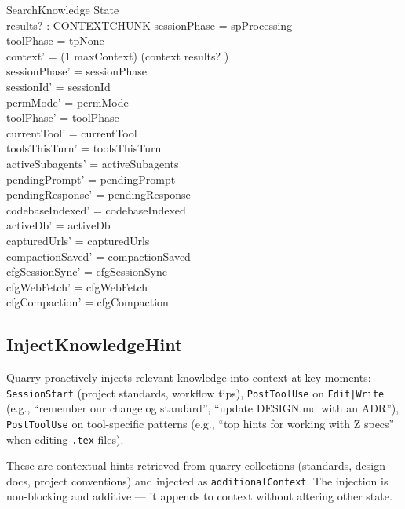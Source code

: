 \documentclass[a4paper,10pt,fleqn]{article}
\begin{document}
\begin{schema}{SearchKnowledge}
  \Delta State \\
  results? : CONTEXTCHUNK
  \where
  sessionPhase = spProcessing \\
  toolPhase = tpNone \\
  context' = (1 \upto maxContext) \dres (context \cat \langle results? \rangle) \\
  sessionPhase' = sessionPhase \\
  sessionId' = sessionId \\
  permMode' = permMode \\
  toolPhase' = toolPhase \\
  currentTool' = currentTool \\
  toolsThisTurn' = toolsThisTurn \\
  activeSubagents' = activeSubagents \\
  pendingPrompt' = pendingPrompt \\
  pendingResponse' = pendingResponse \\
  codebaseIndexed' = codebaseIndexed \\
  activeDb' = activeDb \\
  capturedUrls' = capturedUrls \\
  compactionSaved' = compactionSaved \\
  cfgSessionSync' = cfgSessionSync \\
  cfgWebFetch' = cfgWebFetch \\
  cfgCompaction' = cfgCompaction
\end{schema}

\subsection{InjectKnowledgeHint}

Quarry proactively injects relevant knowledge into context at key
moments: \texttt{SessionStart} (project standards, workflow tips),
\texttt{PostToolUse} on \texttt{Edit|Write} (e.g., ``remember our
changelog standard'', ``update DESIGN.md with an ADR''),
\texttt{PostToolUse} on tool-specific patterns (e.g., ``top hints
for working with Z specs'' when editing \texttt{.tex} files).

These are contextual hints retrieved from quarry collections
(standards, design docs, project conventions) and injected as
\texttt{additionalContext}. The injection is non-blocking and
additive --- it appends to context without altering other state.
\end{document}
